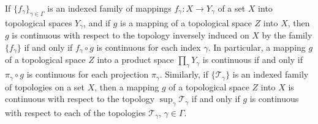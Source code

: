 If $\{f_\gamma\}_{\gamma \in \Gamma}$ is an indexed family of mappings $f_\gamma : X \rightarrow Y_\gamma$ of a set $X$ into topological spaces $Y_\gamma$, and if $g$ is a mapping of a topological space $Z$ into $X$, then $g$ is continuous with respect to the topology inversely induced on $X$ by the family $\{f_\gamma\}$ if and only if $f_\gamma \circ g$ is continuous for each index $\gamma$. In particular, a mapping $g$ of a topological space $Z$ into a product space $\prod_\gamma Y_\gamma$ is continuous if and only if $\pi_\gamma \circ g$ is continuous for each projection $\pi_\gamma$. Similarly, if $\{\mathcal{T}_\gamma\}$ is an indexed family of topologies on a set $X$, then a mapping $g$ of a topological space $Z$ into $X$ is continuous with respect to the topology $\sup_\gamma \mathcal{T}_\gamma$ if and only if $g$ is continuous with respect to each of the topologies $\mathcal{T}_\gamma$, $\gamma \in \Gamma$.

